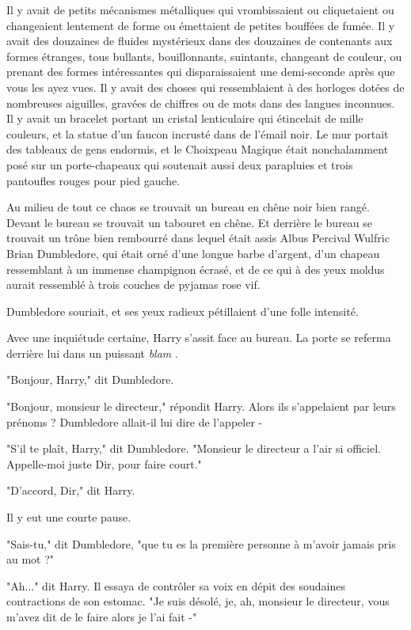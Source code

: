 Il y avait de petits mécanismes métalliques qui vrombissaient ou cliquetaient ou changeaient lentement de forme ou émettaient de petites bouffées de fumée. Il y avait des douzaines de fluides mystérieux dans des douzaines de contenants aux formes étranges, tous bullants, bouillonnants, suintants, changeant de couleur, ou prenant des formes intéressantes qui disparaissaient une demi-seconde après que vous les ayez vues. Il y avait des choses qui ressemblaient à des horloges dotées de nombreuses aiguilles, gravées de chiffres ou de mots dans des langues inconnues. Il y avait un bracelet portant un cristal lenticulaire qui étincelait de mille couleurs, et la statue d'un faucon incrusté dans de l'émail noir. Le mur portait des tableaux de gens endormis, et le Choixpeau Magique était nonchalamment posé sur un porte-chapeaux qui soutenait aussi deux parapluies et trois pantoufles rouges pour pied gauche.

Au milieu de tout ce chaos se trouvait un bureau en chêne noir bien rangé. Devant le bureau se trouvait un tabouret en chêne. Et derrière le bureau se trouvait un trône bien rembourré dans lequel était assis Albus Percival Wulfric Brian Dumbledore, qui était orné d'une longue barbe d'argent, d'un chapeau ressemblant à un immense champignon écrasé, et de ce qui à des yeux moldus aurait ressemblé à trois couches de pyjamas rose vif.

Dumbledore souriait, et ses yeux radieux pétillaient d'une folle intensité.

Avec une inquiétude certaine, Harry s'assit face au bureau. La porte se referma derrière lui dans un puissant \emph{blam} .

"Bonjour, Harry," dit Dumbledore.

"Bonjour, monsieur le directeur," répondit Harry. Alors ils s'appelaient par leurs prénoms ? Dumbledore allait-il lui dire de l'appeler -

"S'il te plaît, Harry," dit Dumbledore. "Monsieur le directeur a l'air si officiel. Appelle-moi juste Dir, pour faire court."

"D'accord, Dir," dit Harry.

Il y eut une courte pause.

"Sais-tu," dit Dumbledore, "que tu es la première personne à m'avoir jamais pris au mot ?"

"Ah..." dit Harry. Il essaya de contrôler sa voix en dépit des soudaines contractions de son estomac. "Je suis désolé, je, ah, monsieur le directeur, vous m'avez dit de le faire alors je l'ai fait -"

